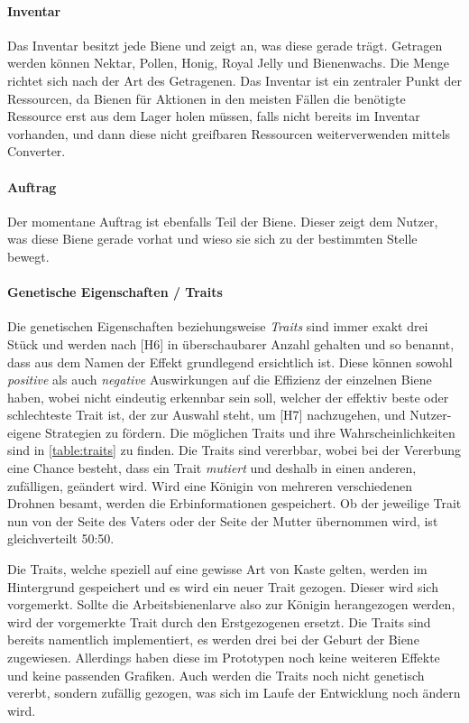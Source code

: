 \paragraph{Inventar} 
Das Inventar besitzt jede Biene und zeigt an, was diese gerade trägt. Getragen werden können Nektar, Pollen, Honig, Royal Jelly und Bienenwachs. Die Menge richtet sich nach der Art des Getragenen. Das Inventar ist ein zentraler Punkt der Ressourcen, da Bienen für Aktionen in den meisten Fällen die benötigte Ressource erst aus dem Lager holen müssen, falls nicht bereits im Inventar vorhanden, und dann diese nicht greifbaren Ressourcen weiterverwenden mittels Converter.

\paragraph{Auftrag} 
Der momentane Auftrag ist ebenfalls Teil der Biene. Dieser zeigt dem Nutzer, was diese Biene gerade vorhat und wieso sie sich zu der bestimmten Stelle bewegt.

\paragraph{Genetische Eigenschaften / Traits} 
Die genetischen Eigenschaften beziehungsweise \textit{Traits} sind immer exakt drei Stück und werden nach [H6] in überschaubarer Anzahl gehalten und so benannt, dass aus dem Namen der Effekt grundlegend ersichtlich ist. Diese können sowohl \textit{positive} als auch \textit{negative} Auswirkungen auf die Effizienz der einzelnen Biene haben, wobei nicht eindeutig erkennbar sein soll, welcher der effektiv beste oder schlechteste Trait ist, der zur Auswahl steht, um [H7] nachzugehen, und Nutzer-eigene Strategien zu fördern. Die möglichen Traits und ihre Wahrscheinlichkeiten sind in \autoref{table:traits} zu finden. Die Traits sind vererbbar, wobei bei der Vererbung eine Chance besteht, dass ein Trait \textit{mutiert} und deshalb in einen anderen, zufälligen, geändert wird. Wird eine Königin von mehreren verschiedenen Drohnen besamt, werden die Erbinformationen gespeichert. Ob der jeweilige Trait nun von der Seite des Vaters oder der Seite der Mutter übernommen wird, ist gleichverteilt 50:50. 

Die Traits, welche speziell auf eine gewisse Art von Kaste gelten, werden im Hintergrund gespeichert und es wird ein neuer Trait gezogen. Dieser wird sich vorgemerkt. Sollte die Arbeitsbienenlarve also zur Königin herangezogen werden, wird der vorgemerkte Trait durch den Erstgezogenen ersetzt. Die Traits sind bereits namentlich implementiert, es werden drei bei der Geburt der Biene zugewiesen. Allerdings haben diese im Prototypen noch keine weiteren Effekte und keine passenden Grafiken. Auch werden die Traits noch nicht genetisch vererbt, sondern zufällig gezogen, was sich im Laufe der Entwicklung noch ändern wird.

